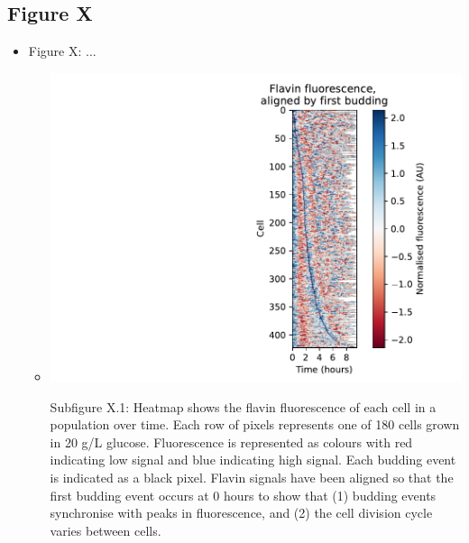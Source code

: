 \subsection{Figure X}
\begin{itemize}
\item Figure X: ...

\begin{itemize}
\item \begin{center}
\includegraphics[width=.9\linewidth]{htb2mCherry_613_plots_7.pdf}
\end{center} Subfigure X.1: Heatmap shows the flavin fluorescence of each cell in a population over time.  Each row of pixels represents one of 180 cells grown in 20 g/L glucose.  Fluorescence is represented as colours with red indicating low signal and blue indicating high signal.  Each budding event is indicated as a black pixel.  Flavin signals have been aligned so that the first budding event occurs at 0 hours to show that (1) budding events synchronise with peaks in fluorescence, and (2) the cell division cycle varies between cells.

\end{itemize}
\end{itemize}

